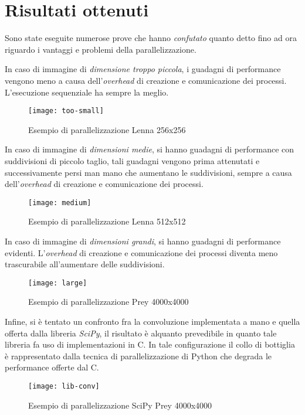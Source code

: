 \chapter{Risultati ottenuti}

Sono state eseguite numerose prove che hanno \textit{confutato} quanto detto fino ad ora riguardo i vantaggi e problemi della parallelizzazione.\newline

\noindent In caso di immagine di \textit{dimensione troppo piccola}, i guadagni di performance vengono meno a causa dell'\textit{overhead} di creazione e comunicazione dei processi. L'esecuzione sequenziale ha sempre la meglio.

\begin{figure}[H]
	\centering
	\texttt{[image: too-small]}
	\caption{Esempio di parallelizzazione Lenna 256x256}
\end{figure}

\noindent In caso di immagine di \textit{dimensioni medie}, si hanno guadagni di performance con suddivisioni di piccolo taglio, tali guadagni vengono prima attenutati e successivamente persi man mano che aumentano le suddivisioni, sempre a causa dell'\textit{overhead} di creazione e comunicazione dei processi.

\begin{figure}[H]
	\centering
	\texttt{[image: medium]}
	\caption{Esempio di parallelizzazione Lenna 512x512}
\end{figure}


\noindent In caso di immagine di \textit{dimensioni grandi}, si hanno guadagni di performance evidenti. L'\textit{overhead} di creazione e comunicazione dei processi diventa meno trascurabile all'aumentare delle suddivisioni.

\begin{figure}[H]
	\centering
	\texttt{[image: large]}
	\caption{Esempio di parallelizzazione Prey 4000x4000}
\end{figure}


\noindent Infine, si è tentato un confronto fra la convoluzione implementata a mano e quella offerta dalla libreria \textit{SciPy}, il risultato è alquanto prevedibile in quanto tale libreria fa uso di implementazioni in C.
In tale configurazione il collo di bottiglia è rappresentato dalla tecnica di parallelizzazione di Python che degrada le performance offerte dal C.
\begin{figure}[H]
	\centering
	\texttt{[image: lib-conv]}
	\caption{Esempio di parallelizzazione SciPy Prey 4000x4000}
\end{figure}